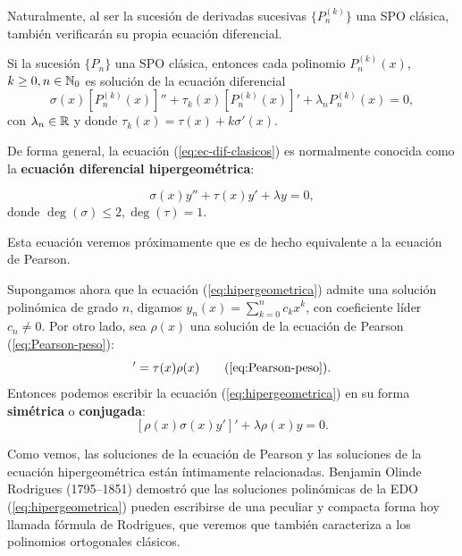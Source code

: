Naturalmente, al ser la sucesión de derivadas sucesivas $\{P^{(k)}_n\}$ una SPO clásica, también verificarán su propia ecuación diferencial.

\begin{corolario}
    \label{cor:derivadas-k-hipergeometrica}
    Si la sucesión $\{P_n\}$ una SPO clásica, entonces cada polinomio $P^{(k)}_n(x)$, $k\geq 0, n\in\mathbb{N}_0$ es solución de la ecuación diferencial
    \begin{equation}
        \label{eq:ec-dif-der-suc}
        \sigma(x)[P_n^{(k)}(x)]'' + \tau_k(x)[P_n^{(k)}(x)]'+\lambda_n P^{(k)}_n(x) = 0,
    \end{equation}
    con $\lambda_n\in\mathbb{R}$ y donde $\tau_k(x)=\tau(x)+k\sigma'(x)$.
\end{corolario}

De forma general, la ecuación (\ref{eq:ec-dif-clasicos}) es normalmente conocida como la \textbf{ecuación diferencial hipergeométrica}:

\begin{equation}
    \label{eq:hipergeometrica}
    \sigma(x)y'' + \tau(x) y' + \lambda y = 0,
\end{equation}
donde $ \deg(\sigma)\leq 2, \deg(\tau)= 1$.

Esta ecuación veremos próximamente que es de hecho equivalente a la ecuación de Pearson. 

Supongamos ahora que la ecuación (\ref{eq:hipergeometrica}) admite una solución polinómica de grado $n$, digamos $y_n(x) = \sum_{k=0}^n c_k x^k$, con coeficiente líder $c_n\neq 0$. Por otro lado, sea $\rho(x)$ una solución de la ecuación de Pearson (\ref{eq:Pearson-peso}):
\begin{equation*}
    [\sigma(x)\rho(x)]'=\tau(x)\rho(x) \tag{\ref{eq:Pearson-peso}}.
\end{equation*}
Entonces podemos escribir la ecuación (\ref{eq:hipergeometrica}) en su forma \textbf{simétrica} o \textbf{conjugada}:
\begin{equation}
    \label{eq:hipergeometrica-conjugada}
    [\rho(x)\sigma(x)y']' + \lambda \rho(x) y = 0.
\end{equation}


Como vemos, las soluciones de la ecuación de Pearson y las soluciones de la ecuación hipergeométrica están íntimamente relacionadas. Benjamin Olinde Rodrigues (1795--1851) demostró que las soluciones polinómicas de la EDO (\ref{eq:hipergeometrica}) pueden escribirse de una peculiar y compacta forma hoy llamada fórmula de Rodrigues, que veremos que también caracteriza a los polinomios ortogonales clásicos.

